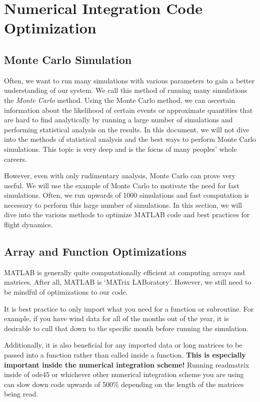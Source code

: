 \documentclass[12pt]{report}
\begin{document}
\section{Numerical Integration Code Optimization}
\subsection{Monte Carlo Simulation}
Often, we want to run many simulations with various parameters to gain a better understanding of our system. We call this method of running many simulations the \textit{Monte Carlo} method. Using the Monte Carlo method, we can ascertain information about the likelihood of certain events or approximate quantities that are hard to find analytically by running a large number of simulations and performing statistical analysis on the results. In this document, we will not dive into the methods of statistical analysis and the best ways to perform Monte Carlo simulations. This topic is very deep and is the focus of many peoples’ whole careers.

However, even with only rudimentary analysis, Monte Carlo can prove very useful. We will use the example of Monte Carlo to motivate the need for fast simulations. Often, we run upwards of 1000 simulations and fast computation is necessary to perform this large number of simulations. In this section, we will dive into the various methods to optimize MATLAB code and best practices for flight dynamics.
\subsection{Array and Function Optimizations}
MATLAB is generally quite computationally efficient at computing arrays and matrices. After all, MATLAB is ‘MATrix LABoratory’. However, we still need to be mindful of optimizations to our code.

It is best practice to only import what you need for a function or subroutine. For example, if you have wind data for all of the months out of the year, it is desirable to cull that down to the specific month before running the simulation.

Additionally, it is also beneficial for any imported data or long matrices to be passed into a function rather than called inside a function. \textbf{This is especially important inside the numerical integration scheme! }Running readmatrix inside of ode45 or whichever other numerical integration scheme you are using can slow down code upwards of 500\% depending on the length of the matrices being read.
\end{document}
